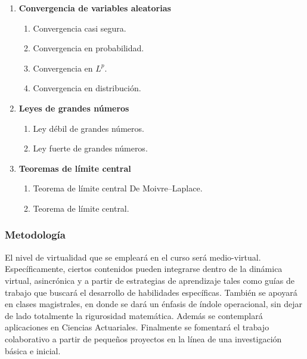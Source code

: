 \begin{refsection}
\begin{enumerate}
\begin{enumerate}
\item Distribución condicional.
\item Función de masa y densidad condicional.
\item Esperanza condicional elemental.
\item Esperanza condicional a una $\sigma$-álgebra.
\end{enumerate}
\item \textbf{Convergencia de variables aleatorias}
\begin{enumerate}
\item Convergencia casi segura.
\item Convergencia en probabilidad.
\item Convergencia en $L^p$.
\item Convergencia en distribución.
\end{enumerate}
\item \textbf{Leyes de grandes números}
\begin{enumerate}
\item Ley débil de grandes números.
\item Ley fuerte de grandes números.
\end{enumerate}
\item \textbf{Teoremas de límite central}
\begin{enumerate}
\item Teorema de límite central De Moivre--Laplace.
\item Teorema de límite central.
\end{enumerate}
\end{enumerate}

\subsubsection*{Metodología}

El nivel de virtualidad que se empleará en el curso será medio-virtual. Específicamente, ciertos contenidos pueden integrarse dentro de la dinámica virtual, asincrónica y a partir de estrategias de aprendizaje tales como guías de trabajo que buscará el desarrollo de habilidades específicas. También se apoyará en clases magistrales, en donde se dará un énfasis de índole operacional, sin dejar de lado totalmente la rigurosidad matemática. Además se contemplará aplicaciones en Ciencias Actuariales. Finalmente se fomentará el trabajo colaborativo a partir de pequeños proyectos en la línea de una investigación básica e inicial.


\end{refsection}
